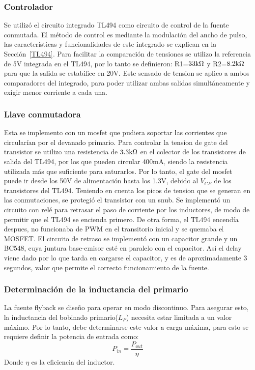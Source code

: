 \subsubsection{Controlador}

Se utilizó el circuito integrado TL494 como circuito de control de la fuente conmutada. El método de control es mediante la modulación del ancho de pulso, las características y funcionalidades de este integrado se explican en la Sección~\ref{TL494}. Para facilitar la comparación de tensiones se utilizo la referencia de 5V integrada en el TL494, por lo tanto se definieron: R1=$33\mbox{k}\Omega $ y R2=$8.2\mbox{k}\Omega$ para que la salida se estabilice en 20V. Este sensado de tension se aplico a ambos comparadores del integrado, para poder utilizar ambas salidas simultáneamente y exigir menor corriente a cada una.
\medskip
\subsubsection{Llave conmutadora}

Esta se implemento con un mosfet que pudiera soportar las corrientes que circularían por el devanado primario. Para controlar la tension de gate del transistor se utilizo una resistencia de $3.3\mbox{k}\Omega$ en el colector de los transistores de salida del TL494, por los que pueden circular 400mA, siendo la resistencia utilizada más que suficiente para saturarlos. Por lo tanto, el gate del mosfet puede ir desde los 50V de alimentación hasta los 1.3V, debido al $V_{CE}$ de los transistores del TL494. Teniendo en cuenta los picos de tension que se generan en las conmutaciones, se protegió el transistor con un snub.
Se implementó un circuito con relé para retrasar el paso de corriente por los inductores, de modo de permitir que el TL494 se encienda primero. De otra forma, el TL494 encendía despues, no funcionaba de PWM en el transitorio inicial y se quemaba el MOSFET. El circuito de retraso se implementó con un capacitor grande y un BC548, cuya juntura base-emisor esté en paralelo con el capacitor. Así el delay viene dado por lo que tarda en cargarse el capacitor, y es de aproximadamente 3 segundos, valor que permite el correcto funcionamiento de la fuente. 

\medskip
\subsubsection{Determinación de la inductancia del primario}

La fuente flyback se diseño para operar en modo discontinuo. Para asegurar esto, la 
inductancia del bobinado primario($L_P$) necesita estar limitada a un valor máximo.
Por lo tanto, debe determinarse este valor a carga máxima, para esto se requiere definir la
potencia de entrada como:
$$
P_{in}= \frac{P_{out}}{\eta}
$$
Donde $\eta$ es la eficiencia del inductor.

